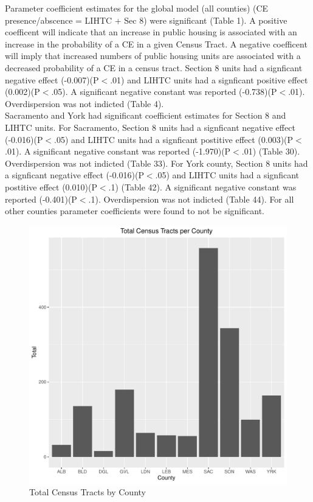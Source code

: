 \documentclass{article}\usepackage[]{graphicx}\usepackage[]{color}
\makeatletter
\def\maxwidth{ %
  \ifdim\Gin@nat@width>\linewidth
    \linewidth
  \else
    \Gin@nat@width
  \fi
}
\newenvironment{knitrout}{}{} %
\makeatother
\begin{document}
Parameter coefficient estimates for the global model (all counties) (CE presence/abscence = LIHTC + Sec 8) were significant (Table 1). A positive coefficent will indicate that an increase in public housing is associated with an increase in the probability of a CE in a given Census Tract. A negative coefficent will imply that increased numbers of public housing units are associated with a decreased probability of a CE in a census tract. Section 8 units had a signficant negative effect (-0.007)(P$<$.01) and LIHTC units had a signficant positive effect (0.002)(P$<$.05). A significant negative constant was reported (-0.738)(P$<$.01). Overdispersion was not indicted (Table 4).\\

Sacramento and York had significant coefficient estimates for Section 8 and LIHTC units. For Sacramento, Section 8 units had a signficant negative effect (-0.016)(P$<$.05) and LIHTC units had a signficant postitive effect (0.003)(P$<$.01). A significant negative constant was reported (-1.970)(P$<$.01) (Table 30). Overdispersion was not indicted (Table 33). For York county,  Section 8 units had a signficant negative effect (-0.016)(P$<$.05) and LIHTC units had a signficant postitive effect (0.010)(P$<$.1) (Table 42). A significant negative constant was reported (-0.401)(P$<$.1). Overdispersion was not indicted (Table 44). For all other counties parameter coefficients were found to not be significant.

\pagebreak
\newpage
\FloatBarrier


\begin{knitrout}
\color{fgcolor}\begin{figure}
\includegraphics[width=\maxwidth]{figure/Bar_All_Counties_Tract-1} \caption[Total Census Tracts by County]{Total Census Tracts by County}\label{fig:Bar_All_Counties_Tract}
\end{figure}


\end{knitrout}
\end{document}
